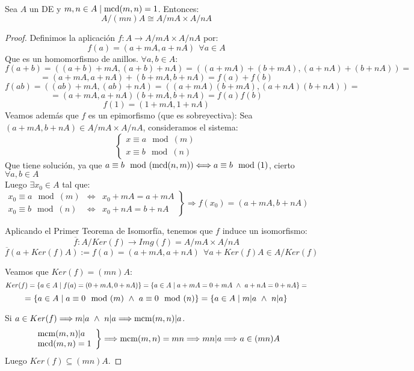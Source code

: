 \begin{teo}
    \ \\
    \label{teoChinoResto}
    Sea $A$ un DE y $m, n \in A \mid \operatorname{mcd}(m,n) =1$. Entonces:
    $$A/(mn)A \cong A/mA \times A/nA$$
\begin{proof}
    Definimos la aplicación $f:A\rightarrow A/mA \times A/nA$ por: $$f(a) = (a+mA, a+nA)~~\forall a \in A$$
    Que es un homomorfismo de anillos. $\forall a,b \in A$:
    $$f(a+b) = ((a+b)+mA, (a+b)+nA) = ((a+mA)+(b+mA), (a+nA)+(b+nA)) =$$
    $$=(a+mA, a+nA)+(b+mA,b+nA) = f(a) + f(b)$$
    $$f(ab) = ((ab)+mA, (ab)+nA) = ((a+mA)(b+mA), (a+nA)(b+nA)) =$$
    $$=(a+mA, a+nA)(b+mA,b+nA) = f(a)f(b)$$
    $$f(1) = (1+mA, 1+nA)$$
    Veamos además que $f$ es un epimorfismo (que es sobreyectiva):\newline
    Sea $(a+mA, b+nA) \in A/mA \times A/nA$, consideramos el sistema:
    $$\left\{ \begin{array}{l}
            x\equiv a\mod(m) \\
            x\equiv b\mod(n)
        \end{array} \right.$$
    Que tiene solución, ya que $a\equiv b\mod(\operatorname{mcd}(n,m)) \Longleftrightarrow a\equiv b\mod(1)$, cierto $\forall a,b \in A$\\

    
    Luego $\exists x_0 \in A$ tal que:
    $$\left. \begin{array}{llc}
            x_0\equiv a\mod(m) & \Longleftrightarrow & x_0+mA = a+mA \\
            x_0\equiv b\mod(n) & \Longleftrightarrow & x_0+nA = b+nA
        \end{array} \right\} \Longrightarrow f(x_0) = (a+mA, b+nA)$$

    
    Aplicando el Primer Teorema de Isomorfía, tenemos que $f$ induce un isomorfismo:
    $$\overline{f}:A/Ker(f)\rightarrow Img(f)=A/mA\times A/nA$$
    $$\overline{f}(a+Ker(f)A):=f(a) = (a+mA, a+nA)~~\forall a+Ker(f)A \in A/Ker(f)$$

    \bigskip
    
    Veamos que $Ker(f) = (mn)A$:
    $$Ker(f) = \{a \in A \mid f(a) = (0+mA, 0+nA)\} = \{a \in A \mid a+mA=0+mA \ \land \  a+nA = 0+nA\} = $$
    $$= \{a \in A \mid a\equiv 0\mod(m) \ \land \  a\equiv 0\mod(n)\} = \{a \in A \mid m|a \ \land \  n|a \}$$

    \bigskip
    
    Si $a \in Ker(f) \Longrightarrow m|a \ \land \  n|a \Longrightarrow \operatorname{mcm}(m,n)|a$.
    $$\left. \begin{array}{l}
            \operatorname{mcm}(m,n)|a \\
            \operatorname{mcd}(m,n) = 1
        \end{array} \right\} \Longrightarrow \operatorname{mcm}(m,n) = mn \Longrightarrow mn|a \Longrightarrow a\in (mn)A$$
    Luego $Ker(f) \subseteq (mn)A$.


\end{proof}
\end{teo}
